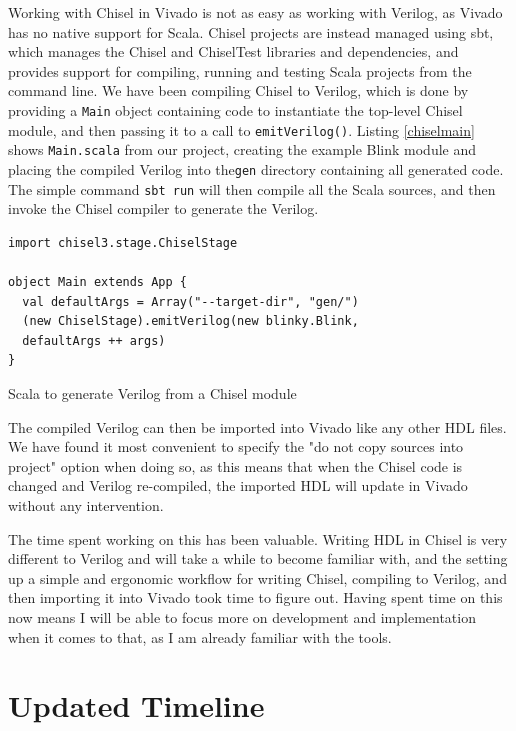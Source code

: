 \documentclass[a4paper,fleqn,12pt]{article}
\begin{document}
Working with Chisel in Vivado is not as easy as working with Verilog, as Vivado has no native support for Scala. Chisel projects are instead managed using sbt, which manages the Chisel and ChiselTest libraries and dependencies, and provides support for compiling, running and testing Scala projects from the command line. We have been compiling Chisel to Verilog, which is done by providing a \texttt{Main} object containing code to instantiate the top-level Chisel module, and then passing it to a call to \texttt{emitVerilog()}. Listing \ref{chiselmain} shows \texttt{Main.scala} from our project, creating the example Blink module and placing the compiled Verilog into the\texttt{gen} directory containing all generated code. The simple command \texttt{sbt run} will then compile all the Scala sources, and then invoke the Chisel compiler to generate the Verilog.

\begin{listing}[]
	\vspace{0.5cm}
	\begin{verbatim}
import chisel3.stage.ChiselStage

object Main extends App {
  val defaultArgs = Array("--target-dir", "gen/")
  (new ChiselStage).emitVerilog(new blinky.Blink,
  defaultArgs ++ args)
}
    \end{verbatim}
	\caption{Scala to generate Verilog from a Chisel module}
	\label{chiselmain}
\end{listing}

The compiled Verilog can then be imported into Vivado like any other HDL files. We have found it most convenient to specify the "do not copy sources into project" option when doing so, as this means that when the Chisel code is changed and Verilog re-compiled, the imported HDL will update in Vivado without any intervention.

The time spent working on this has been valuable. Writing HDL in Chisel is very different to Verilog and will take a while to become familiar with, and the setting up a simple and ergonomic workflow for writing Chisel, compiling to Verilog, and then importing it into Vivado took time to figure out. Having spent time on this now means I will be able to focus more on development and implementation when it comes to that, as I am already familiar with the tools.

\section{Updated Timeline}
\end{document}
